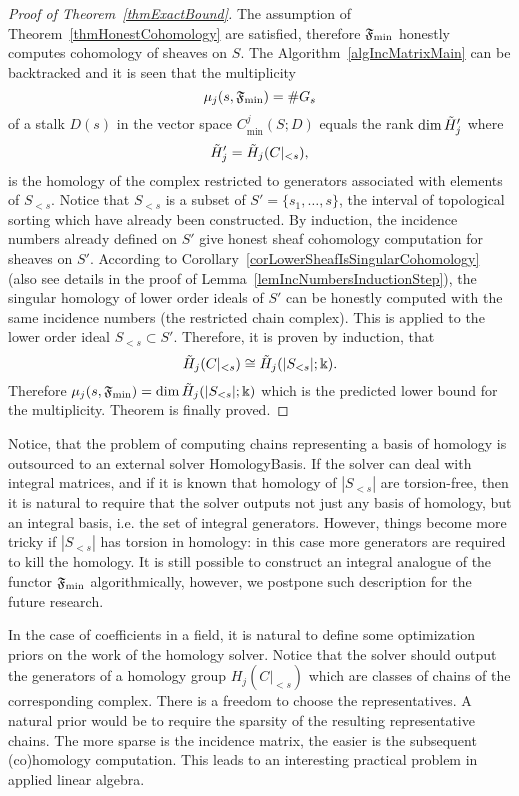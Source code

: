 \begin{proof}[Proof of Theorem~\ref{thmExactBound}]
The assumption of Theorem~\ref{thmHonestCohomology} are satisfied, therefore $\mathfrak{F}_{\min}$ honestly computes cohomology of sheaves on $S$. The Algorithm~\ref{algIncMatrixMain} can be backtracked and it is seen that the multiplicity
\[
\mu_j(s,\mathfrak{F}_{\min})=\#G_s
\]
of a stalk $D(s)$ in the vector space $C^j_{\min}(S;D)$ equals the rank $\dim \tilde{H}_j'$ where
\[
\tilde{H}_j'=\tilde{H}_j(C|_{<s}),
\]
is the homology of the complex restricted to generators associated with elements of $S_{<s}$. Notice that $S_{<s}$ is a subset of $S'=\{s_1,\ldots,s\}$, the interval of topological sorting which have already been constructed. By induction, the incidence numbers already defined on $S'$ give honest sheaf cohomology computation for sheaves on $S'$. According to Corollary~\ref{corLowerSheafIsSingularCohomology} (also see details in the proof of Lemma~\ref{lemIncNumbersInductionStep}), the singular homology of lower order ideals of $S'$ can be honestly computed with the same incidence numbers (the restricted chain complex). This is applied to the lower order ideal $S_{<s}\subset S'$. Therefore, it is proven by induction, that
\[
\tilde{H}_j(C|_{<s})\cong \tilde{H}_j(|S_{<s}|;\Bbbk).
\]
Therefore $\mu_j(s,\mathfrak{F}_{\min})=\dim \tilde{H}_j(|S_{<s}|;\Bbbk)$ which is the predicted lower bound for the multiplicity. Theorem is finally proved.
\end{proof}

\begin{rem}\label{remExternalSolverIntegral}
Notice, that the problem of computing chains representing a basis of homology is outsourced to an external solver HomologyBasis. If the solver can deal with integral matrices, and if it is known that homology of $|S_{<s}|$ are torsion-free, then it is natural to require that the solver outputs not just any basis of homology, but an integral basis, i.e. the set of integral generators. However, things become more tricky if $|S_{<s}|$ has torsion in homology: in this case more generators are required to kill the homology. It is still possible to construct an integral analogue of the functor $\mathfrak{F}_{\min}$ algorithmically, however, we postpone such description for the future research.
\end{rem}

\begin{rem}\label{remSparsity}
In the case of coefficients in a field, it is natural to define some optimization priors on the work of the homology solver. Notice that the solver should output the generators of a homology group $H_j(C|_{<s})$ which are classes of chains of the corresponding complex. There is a freedom to choose the representatives. A natural prior would be to require the sparsity of the resulting representative chains. The more sparse is the incidence matrix, the easier is the subsequent (co)homology computation. This leads to an interesting practical problem in applied linear algebra.
\end{rem}

